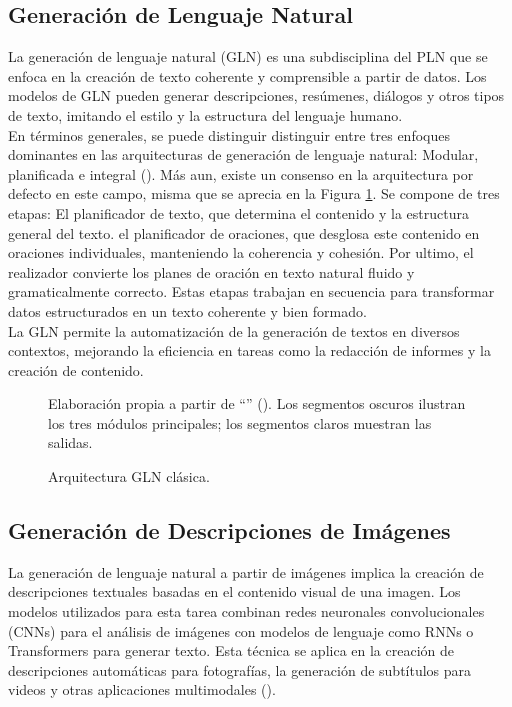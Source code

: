 \subsection{Generación de Lenguaje Natural}
La generación de lenguaje natural (GLN) es una subdisciplina del PLN que se enfoca en la creación de texto coherente y comprensible a partir de datos. Los modelos de GLN pueden generar descripciones, resúmenes, diálogos y otros tipos de texto, imitando el estilo y la estructura del lenguaje humano.\\
En términos generales, se puede distinguir distinguir entre tres enfoques dominantes en las arquitecturas de generación de lenguaje natural: Modular, planificada e integral (\cite{gatt2018survey}).
Más aun, existe un consenso en la arquitectura por defecto en este campo, misma que se aprecia en la Figura \ref{fig:nlg_architecture}. Se compone de tres etapas: El planificador de texto, que determina el contenido y la estructura general del texto. el planificador de oraciones, que desglosa este contenido en oraciones individuales, manteniendo la coherencia y cohesión. Por ultimo, el realizador convierte los planes de oración en texto natural fluido y gramaticalmente correcto. Estas etapas trabajan en secuencia para transformar datos estructurados en un texto coherente y bien formado.\\
La GLN permite la automatización de la generación de textos en diversos contextos, mejorando la eficiencia en tareas como la redacción de informes y la creación de contenido.

\begin{figure}[htb]
	\centering
    
    \vspace{-0.5cm}
	\caption{Arquitectura GLN clásica.}
    \vspace{-0.2cm}
	\footnotesize{{Elaboración propia a partir de ``\textit{}'' (\citeyear{gatt2018survey}). Los segmentos oscuros ilustran los tres módulos principales; los segmentos claros muestran las salidas.}}
	\label{fig:nlg_architecture} 
\end{figure}

\subsection{Generación de Descripciones de Imágenes}
La generación de lenguaje natural a partir de imágenes implica la creación de descripciones textuales basadas en el contenido visual de una imagen. Los modelos utilizados para esta tarea combinan redes neuronales convolucionales (CNNs) para el análisis de imágenes con modelos de lenguaje como RNNs o Transformers para generar texto. Esta técnica se aplica en la creación de descripciones automáticas para fotografías, la generación de subtítulos para videos y otras aplicaciones multimodales (\cite{vinyals2015show}).

